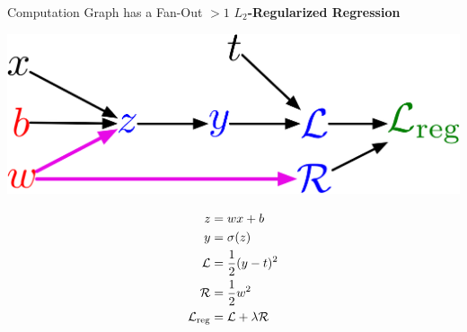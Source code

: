 \documentclass[handout,aspectratio=169]{beamer}
\begin{document}
\begin{frame}{Computation Graph has a Fan-Out $> 1$}
{\bf $L_2$-Regularized Regression}
\begin{minipage}{0.7\textwidth}
\centering
\includegraphics[width=0.9\linewidth]{pics/reg_computation_graph.png}

\end{minipage}\begin{minipage}{0.3\textwidth}
\centering
    \begin{align*}
      z &= w x + b \\
      y &= \sigma(z) \\
      {\cal L} &= \frac{1}{2} (y - t)^2 \\
      \mathcal{R} &= \frac{1}{2} w^2 \\
      {\cal L}_{\rm reg} &= {\cal L} + \lambda \mathcal{R}
    \end{align*}
\end{minipage}
\end{frame}
\end{document}
